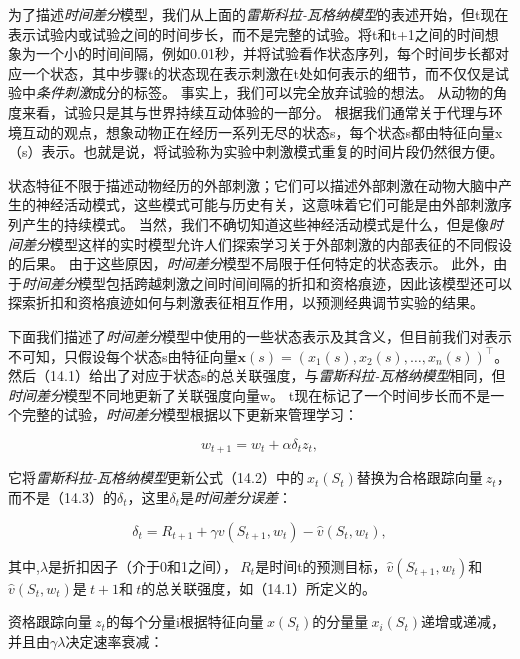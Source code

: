 为了描述\textit{时间差分}模型，我们从上面的\textit{雷斯科拉-瓦格纳模型}的表述开始，但t现在表示试验内或试验之间的时间步长，而不是完整的试验。将t和t+1之间的时间想象为一个小的时间间隔，例如0.01秒，并将试验看作状态序列，每个时间步长都对应一个状态，其中步骤t的状态现在表示刺激在t处如何表示的细节，而不仅仅是试验中\textit{条件刺激}成分的标签。
事实上，我们可以完全放弃试验的想法。
从动物的角度来看，试验只是其与世界持续互动体验的一部分。
根据我们通常关于代理与环境互动的观点，想象动物正在经历一系列无尽的状态s，每个状态s都由特征向量x（s）表示。也就是说，将试验称为实验中刺激模式重复的时间片段仍然很方便。


状态特征不限于描述动物经历的外部刺激；它们可以描述外部刺激在动物大脑中产生的神经活动模式，这些模式可能与历史有关，这意味着它们可能是由外部刺激序列产生的持续模式。
当然，我们不确切知道这些神经活动模式是什么，但是像\textit{时间差分}模型这样的实时模型允许人们探索学习关于外部刺激的内部表征的不同假设的后果。
由于这些原因，\textit{时间差分}模型不局限于任何特定的状态表示。
此外，由于\textit{时间差分}模型包括跨越刺激之间时间间隔的折扣和资格痕迹，因此该模型还可以探索折扣和资格痕迹如何与刺激表征相互作用，以预测经典调节实验的结果。


下面我们描述了\textit{时间差分}模型中使用的一些状态表示及其含义，但目前我们对表示不可知，只假设每个状态s由特征向量$\mathbf{x}(s)=\left(x_{1}(s), x_{2}(s), \ldots, x_{n}(s)\right)^{\top}$。
然后（14.1）给出了对应于状态s的总关联强度，与\textit{雷斯科拉-瓦格纳模型}相同，但\textit{时间差分}模型不同地更新了关联强度向量w。
t现在标记了一个时间步长而不是一个完整的试验，\textit{时间差分}模型根据以下更新来管理学习：

\begin{equation}\label{key}
	w_{t+1} = w_t + \alpha \delta_t z_t,
\end{equation}

它将\textit{雷斯科拉-瓦格纳模型}更新公式（14.2）中的$\ x_t(S_t)$替换为合格跟踪向量$\ z_t$，而不是（14.3）的$\delta_t$，这里$\delta_t$是\textit{时间差分误差}：


\begin{equation}\label{eq:td_error}
	\delta_t = 
	R_{t+1} + \gamma v (S_{t+1}, w_t) - \hat v(S_t, w_t),
\end{equation}


其中,$\lambda$是折扣因子（介于0和1之间），$\ R_t$是时间t的预测目标，$\hat{v}(S_{t+1}, w_t)$和$\hat{v}(S_t, w_t)$是$\ t+1$和$\ t$的总关联强度，如（14.1）所定义的。


资格跟踪向量$\ z_t$的每个分量i根据特征向量$\ x(S_t)$的分量量$\ x_i(S_t)$递增或递减，并且由$\gamma \lambda$决定速率衰减：

